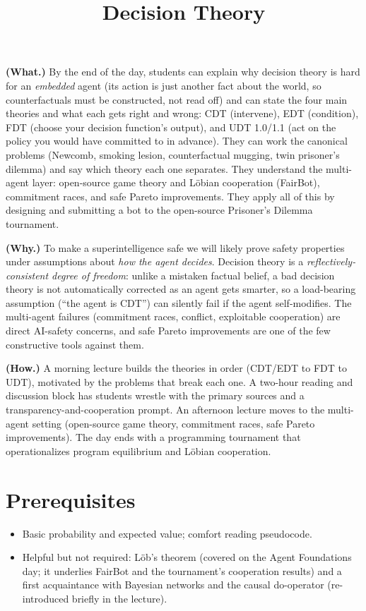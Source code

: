 \documentclass[11pt]{article}
\title{Decision Theory}
\author{
  \authorname{Daniel C}
  \and
  \authorname{Satya Benson}
}
\begin{document}
\maketitle

\begin{learningoutcomes}
\textbf{(What.)} By the end of the day, students can explain why decision theory is hard for an \emph{embedded} agent (its action is just another fact about the world, so counterfactuals must be constructed, not read off) and can state the four main theories and what each gets right and wrong: CDT (intervene), EDT (condition), FDT (choose your decision function's output), and UDT 1.0/1.1 (act on the policy you would have committed to in advance). They can work the canonical problems (Newcomb, smoking lesion, counterfactual mugging, twin prisoner's dilemma) and say which theory each one separates. They understand the multi-agent layer: open-source game theory and Löbian cooperation (FairBot), commitment races, and safe Pareto improvements. They apply all of this by designing and submitting a bot to the open-source Prisoner's Dilemma tournament.

\textbf{(Why.)} To make a superintelligence safe we will likely prove safety properties under assumptions about \emph{how the agent decides}. Decision theory is a \emph{reflectively-consistent degree of freedom}: unlike a mistaken factual belief, a bad decision theory is not automatically corrected as an agent gets smarter, so a load-bearing assumption (``the agent is CDT'') can silently fail if the agent self-modifies. The multi-agent failures (commitment races, conflict, exploitable cooperation) are direct AI-safety concerns, and safe Pareto improvements are one of the few constructive tools against them.

\textbf{(How.)} A morning lecture builds the theories in order (CDT/EDT to FDT to UDT), motivated by the problems that break each one. A two-hour reading and discussion block has students wrestle with the primary sources and a transparency-and-cooperation prompt. An afternoon lecture moves to the multi-agent setting (open-source game theory, commitment races, safe Pareto improvements). The day ends with a programming tournament that operationalizes program equilibrium and Löbian cooperation.
\end{learningoutcomes}

\section{Prerequisites}
\begin{itemize}
\item
  Basic probability and expected value; comfort reading pseudocode.
\item
  Helpful but not required: Löb's theorem (covered on the Agent Foundations day; it underlies FairBot and the tournament's cooperation results) and a first acquaintance with Bayesian networks and the causal do-operator (re-introduced briefly in the lecture).
\end{itemize}
\end{document}
